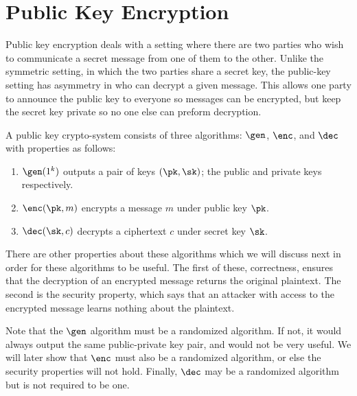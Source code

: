
\newcommand{\fake}{\mathsf{FAKE}}

\chapter{Public Key Encryption}
Public key encryption deals with a setting where there are two parties who wish
to communicate a secret message from one of them to the other. Unlike the symmetric
setting, in which the two parties share a secret key, the public-key setting has
asymmetry in who can decrypt a given message. This allows one party to
announce the public key to everyone so messages can be encrypted, but keep the
secret key private so no one else can preform decryption.

\begin{definition}

    A public key crypto-system consists of three algorithms: $\gen$, $\enc$,
    and $\dec$ with properties as follows:

    \begin{enumerate}
        \item $\gen(1^k)$ outputs a pair of keys $(\pk, \sk)$; the public and private
              keys respectively.

        \item $\enc(\pk, m)$ encrypts a message $m$ under
              public key $\pk$.

        \item $\dec(\sk, c)$ decrypts a ciphertext $c$
              under secret key $\sk$.
    \end{enumerate}
\end{definition}

There are other properties about these algorithms which we will discuss next
in order for these algorithms to be useful. The first of these, correctness,
ensures that the decryption of an encrypted message returns the original plaintext.
The second is the security property, which says that an attacker with access
to the encrypted message learns nothing about the plaintext.

Note that the $\gen$ algorithm must be a randomized algorithm. If not, it would
always output the same public-private key pair, and would not be very useful. We will
later show that $\enc$ must also be a randomized algorithm, or else the security
properties will not hold. Finally, $\dec$ may be a randomized algorithm but is not
required to be one.


